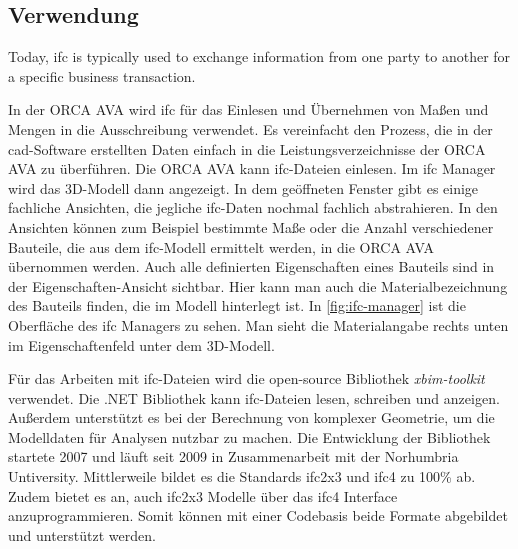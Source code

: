 \subsection{Verwendung}
\label{c:basics:ifc:usage}
\begin{displayquote}
	\glqq Today, \ac{ifc} is typically used to exchange information from one party to another for a specific business transaction.\grqq{} \citep{BuildingSMART_IFC}
\end{displayquote}
In der ORCA AVA wird \ac{ifc} für das Einlesen und Übernehmen von Maßen und Mengen in die Ausschreibung verwendet. Es vereinfacht den Prozess, die in der \ac{cad}-Software erstellten Daten einfach in die Leistungsverzeichnisse der ORCA AVA zu überführen.
Die ORCA AVA kann \ac{ifc}-Dateien einlesen. Im \ac{ifc} Manager wird das 3D-Modell dann angezeigt. In dem geöffneten Fenster gibt es einige fachliche Ansichten, die jegliche \ac{ifc}-Daten nochmal fachlich abstrahieren. In den Ansichten können zum Beispiel bestimmte Maße oder die Anzahl verschiedener Bauteile, die aus dem \ac{ifc}-Modell ermittelt werden, in die ORCA AVA übernommen werden. Auch alle definierten Eigenschaften eines Bauteils sind in der Eigenschaften-Ansicht sichtbar. Hier kann man auch die Materialbezeichnung des Bauteils finden, die im Modell hinterlegt ist. In \autoref{fig:ifc-manager} ist die Oberfläche des \ac{ifc} Managers zu sehen. Man sieht die Materialangabe rechts unten im Eigenschaftenfeld unter dem 3D-Modell.

Für das Arbeiten mit \ac{ifc}-Dateien wird die open-source Bibliothek \textit{xbim-toolkit} \citep{LockleyXbimEssentialslibrary2017} verwendet. Die .NET Bibliothek kann \ac{ifc}-Dateien lesen, schreiben und anzeigen. Außerdem unterstützt es bei der Berechnung von komplexer Geometrie, um die Modelldaten für Analysen nutzbar zu machen. Die Entwicklung der Bibliothek startete 2007 und läuft seit 2009 in Zusammenarbeit mit der Norhumbria Untiversity. Mittlerweile bildet es die Standards \ac{ifc2x3} und \ac{ifc4} zu 100\% ab. Zudem bietet es an, auch \ac{ifc2x3} Modelle über das \ac{ifc4} Interface anzuprogrammieren. Somit können mit einer Codebasis beide Formate abgebildet und unterstützt werden. \citep[vgl.][]{Xbim_ltd_history}



